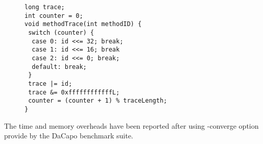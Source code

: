  \begin{figure}[t]
\begin{lstlisting}
long trace;
int counter = 0;
void methodTrace(int methodID) {
 switch (counter) {
  case 0: id <<= 32; break;
  case 1: id <<= 16; break
  case 2: id <<= 0; break;
  default: break;
 }
 trace |= id;
 trace &= 0xffffffffffffL;
 counter = (counter + 1) % traceLength;
}
\end{lstlisting}
\end{figure}

The time and memory overheads have been reported after using -converge option 
provide by the DaCapo benchmark suite.